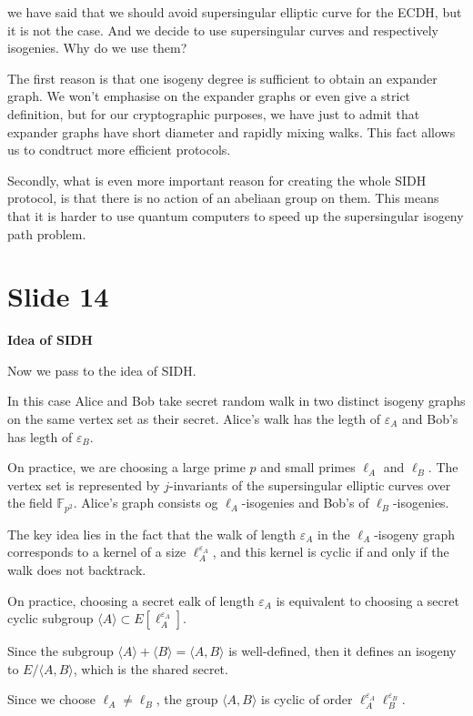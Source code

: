 \documentclass[10 pt]{article}
\begin{document}
{we have said that we should avoid supersingular elliptic curve for the ECDH, but it is not the case. And we decide to use supersingular curves and respectively isogenies. Why do we use them?

The first reason is that one isogeny degree is sufficient to obtain an expander graph. We won't emphasise on the expander graphs or even give a strict definition, but for our cryptographic purposes, we have just to admit that expander graphs have short diameter and rapidly mixing walks. This fact allows us to condtruct more efficient protocols.

Secondly, what is even more important reason for creating the whole SIDH protocol, is that there is no action of an abeliaan group on them. This means that it is harder to use quantum computers to speed up the supersingular isogeny path problem.

\section{Slide 14} \large{\textbf{Idea of SIDH}}

Now we pass to the idea of SIDH. 

In this case Alice and Bob take secret random walk in two distinct isogeny graphs on the same vertex set as their secret. Alice's walk has the legth of $\varepsilon_A$ and Bob's has legth of $\varepsilon_B$.

On practice, we are choosing a large prime $p$ and small primes $\ell_A$ and $\ell_B$. The vertex set is represented by $j$-invariants of the supersingular elliptic curves over the field $\mathbb{F}_{p^2}$. Alice's graph consists og $\ell_A$-isogenies and Bob's of $\ell_B$-isogenies.

The key idea lies in the fact that the walk of length $\varepsilon_A$ in the $\ell_A$-isogeny graph corresponds to a kernel of a size $\ell_A^{\varepsilon_A}$, and this kernel is cyclic if and only if the walk does not backtrack.

On practice, choosing a secret ealk of length $\varepsilon_A$ is equivalent to choosing a secret cyclic subgroup $\langle A \rangle \subset E[\ell_A^{\varepsilon_A}]$.

Since the subgroup $\langle A \rangle + \langle B \rangle = \langle A, B \rangle$ is well-defined, then it defines an isogeny to $E/\langle  A, B \rangle$, which is the shared secret.

Since we choose $\ell_A \neq \ell_B$, the group $\langle A, B \rangle$ is cyclic of order $\ell_A^{\varepsilon_A}\ell_B^{\varepsilon_B}$.

}
\end{document}
